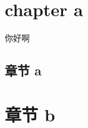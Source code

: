 \documentclass[openright, oneside]{gdutthesis}
\begin{document}
\frontmatter %
\tableofcontents

\mainmatter%

\chapter{chapter a}
\translateenglish%

你好啊
\lipsum%
%

\begin{abstract}{chinese,projecttype=false}
  \translatechinese%
  \zhlipsum[1]
\end{abstract}

\begin{nocleardoublepage}
\chapter{章节 a}
\end{nocleardoublepage}
\zhlipsum[1-4]

\chapter{章节 b}
\zhlipsum[1-4]
\end{document}
